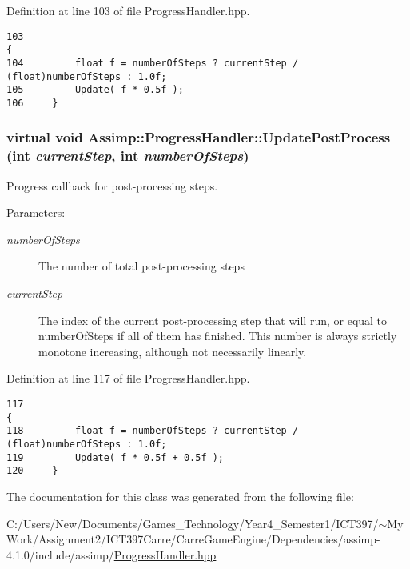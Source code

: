 Definition at line 103 of file ProgressHandler.hpp.

\begin{Code}\begin{verbatim}103                                                                                     {
104         float f = numberOfSteps ? currentStep / (float)numberOfSteps : 1.0f;
105         Update( f * 0.5f );
106     }
\end{verbatim}
\end{Code}


\hypertarget{class_assimp_1_1_progress_handler_57b30d2a9b2ae1f932918f18c30196ed}{
\subsubsection[UpdatePostProcess]{\setlength{\rightskip}{0pt plus 5cm}virtual void Assimp::ProgressHandler::UpdatePostProcess (int {\em currentStep}, \/  int {\em numberOfSteps})}}
\label{class_assimp_1_1_progress_handler_57b30d2a9b2ae1f932918f18c30196ed}


Progress callback for post-processing steps. 

\begin{Desc}
\item[Parameters:]
\begin{description}
\item[{\em numberOfSteps}]The number of total post-processing steps \item[{\em currentStep}]The index of the current post-processing step that will run, or equal to numberOfSteps if all of them has finished. This number is always strictly monotone increasing, although not necessarily linearly. \end{description}
\end{Desc}


Definition at line 117 of file ProgressHandler.hpp.

\begin{Code}\begin{verbatim}117                                                                                        {
118         float f = numberOfSteps ? currentStep / (float)numberOfSteps : 1.0f;
119         Update( f * 0.5f + 0.5f );
120     }
\end{verbatim}
\end{Code}




The documentation for this class was generated from the following file:\begin{CompactItemize}
\item 
C:/Users/New/Documents/Games\_\-Technology/Year4\_\-Semester1/ICT397/$\sim$My Work/Assignment2/ICT397Carre/CarreGameEngine/Dependencies/assimp-4.1.0/include/assimp/\hyperlink{_progress_handler_8hpp}{ProgressHandler.hpp}\end{CompactItemize}
